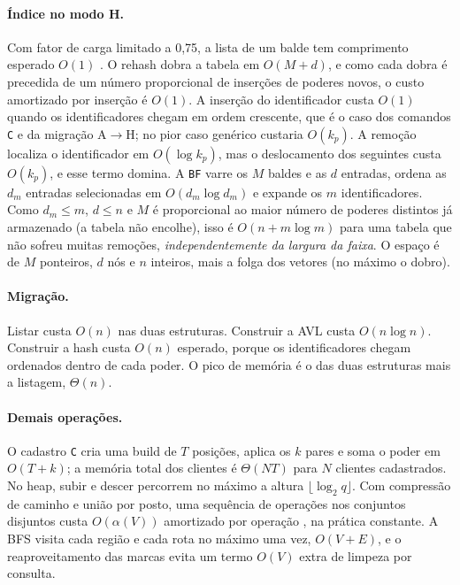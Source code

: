 \documentclass[letterpaper]{article} %
\begin{document}
\paragraph{\'Indice no modo H.} Com fator de carga limitado a 0,75, a lista de um balde tem comprimento esperado $O(1)$ \citep{knuth1998}. O rehash dobra a tabela em $O(M + d)$, e como cada dobra \'e precedida de um n\'umero proporcional de inser\c{c}\~oes de poderes novos, o custo amortizado por inser\c{c}\~ao \'e $O(1)$. A inser\c{c}\~ao do identificador custa $O(1)$ quando os identificadores chegam em ordem crescente, que \'e o caso dos comandos \texttt{C} e da migra\c{c}\~ao A$\to$H; no pior caso gen\'erico custaria $O(k_p)$. A remo\c{c}\~ao localiza o identificador em $O(\log k_p)$, mas o deslocamento dos seguintes custa $O(k_p)$, e esse termo domina. A \texttt{BF} varre os $M$ baldes e as $d$ entradas, ordena as $d_m$ entradas selecionadas em $O(d_m \log d_m)$ e expande os $m$ identificadores. Como $d_m \le m$, $d \le n$ e $M$ \'e proporcional ao maior n\'umero de poderes distintos j\'a armazenado (a tabela n\~ao encolhe), isso \'e $O(n + m \log m)$ para uma tabela que n\~ao sofreu muitas remo\c{c}\~oes, \emph{independentemente da largura da faixa}. O espa\c{c}o \'e de $M$ ponteiros, $d$ n\'os e $n$ inteiros, mais a folga dos vetores (no m\'aximo o dobro).

\paragraph{Migra\c{c}\~ao.} Listar custa $O(n)$ nas duas estruturas. Construir a AVL custa $O(n \log n)$. Construir a hash custa $O(n)$ esperado, porque os identificadores chegam ordenados dentro de cada poder. O pico de mem\'oria \'e o das duas estruturas mais a listagem, $\Theta(n)$.

\paragraph{Demais opera\c{c}\~oes.} O cadastro \texttt{C} cria uma build de $T$ posi\c{c}\~oes, aplica os $k$ pares e soma o poder em $O(T + k)$; a mem\'oria total dos clientes \'e $\Theta(N T)$ para $N$ clientes cadastrados. No heap, subir e descer percorrem no m\'aximo a altura $\lfloor\log_2 q\rfloor$. Com compress\~ao de caminho e uni\~ao por posto, uma sequ\^encia de opera\c{c}\~oes nos conjuntos disjuntos custa $O(\alpha(V))$ amortizado por opera\c{c}\~ao \citep{tarjan1975}, na pr\'atica constante. A BFS visita cada regi\~ao e cada rota no m\'aximo uma vez, $O(V+E)$, e o reaproveitamento das marcas evita um termo $O(V)$ extra de limpeza por consulta.
\end{document}
